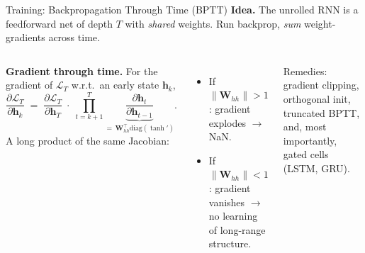 \documentclass[aspectratio=169,11pt]{beamer}
\newcommand{\emphc}[1]{\textcolor{harvardcrimson}{#1}}
\newcommand{\W}{\bm{W}}
\begin{document}
\begin{frame}{Training: Backpropagation Through Time (BPTT)}
\footnotesize
\textbf{Idea.}  The unrolled RNN is a feedforward net of depth $T$ with \emph{shared} weights.  Run backprop, \emph{sum} weight-gradients across time.

\vspace{3pt}
\begin{columns}[T]
\textbf{Gradient through time.} For the gradient of $\mathcal{L}_T$ w.r.t.\ an early state $\bm{h}_k$,
\[
\frac{\partial \mathcal{L}_T}{\partial \bm{h}_k} \;=\; \frac{\partial \mathcal{L}_T}{\partial \bm{h}_T} \;\cdot\; \prod_{t=k+1}^{T} \underbrace{\frac{\partial \bm{h}_t}{\partial \bm{h}_{t-1}}}_{=\,\W_{hh}^{\top}\mathrm{diag}(\tanh')}.
\]
A \emphc{long product of the same Jacobian}:
\begin{itemize}\itemsep1pt
    \item If $\|\W_{hh}\|\!>\!1$: gradient \emphc{explodes} $\to$ NaN.
    \item If $\|\W_{hh}\|\!<\!1$: gradient \emphc{vanishes} $\to$ no learning of long-range structure.
\end{itemize}

\vspace{1pt}
{\scriptsize\emphc{Remedies:} gradient clipping, orthogonal init, truncated BPTT, and, most importantly, \emphc{gated cells} (LSTM, GRU).}

\centering
{}
\end{columns}
\end{frame}
\end{document}
